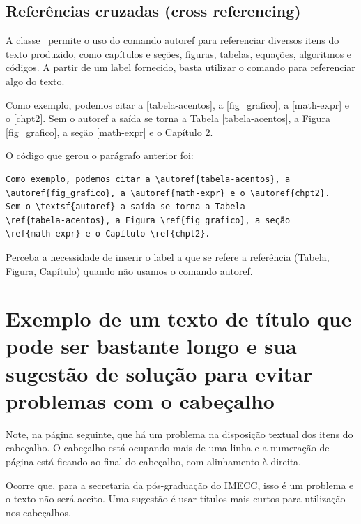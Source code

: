 \section{Referências cruzadas (cross referencing)}

A classe \abnTeX\ permite o uso do comando \textsf{autoref} para referenciar 
diversos itens do texto produzido, como capítulos e seções, figuras, tabelas, 
equações, algoritmos e códigos. A partir de um \textsf{label} fornecido, basta 
utilizar o comando para referenciar algo do texto.

Como exemplo, podemos citar a \autoref{tabela-acentos}, a 
\autoref{fig_grafico}, a \autoref{math-expr} e o \autoref{chpt2}.
Sem o \textsf{autoref} a saída se torna a Tabela 
\ref{tabela-acentos}, a Figura \ref{fig_grafico}, a seção 
\ref{math-expr} e o Capítulo \ref{chpt2}.

O código que gerou o parágrafo anterior foi:
\begin{verbatim}
Como exemplo, podemos citar a \autoref{tabela-acentos}, a 
\autoref{fig_grafico}, a \autoref{math-expr} e o \autoref{chpt2}.
Sem o \textsf{autoref} a saída se torna a Tabela 
\ref{tabela-acentos}, a Figura \ref{fig_grafico}, a seção 
\ref{math-expr} e o Capítulo \ref{chpt2}.
\end{verbatim}

Perceba a necessidade de inserir o label a que se refere a referência
(Tabela, Figura, Capítulo) quando não usamos o comando \textsf{autoref}.


\chapter{Exemplo de um texto de título que pode ser bastante longo e sua sugestão
de solução para evitar problemas com o cabeçalho}
\label{chpt2}

Note, na página seguinte, que há um problema na disposição textual dos
itens do cabeçalho. O cabeçalho está ocupando mais de uma linha e a numeração
de página está ficando ao final do cabeçalho, com alinhamento à direita.

Ocorre que, para a secretaria da pós-graduação do IMECC, isso é um problema e
o texto não será aceito. Uma sugestão é usar títulos mais curtos para utilização
nos cabeçalhos.

